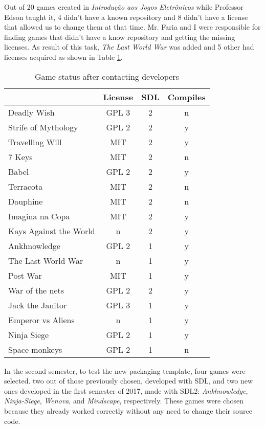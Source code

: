 Out of 20 games created in \textit{Introdu\c{c}\~ao aos Jogos Eletr\^onicos} while Professor Edson taught it, 4 didn't have a known repository and 8 didn't have a license that allowed us to change them at that time. Mr. Faria and I were responsible for finding games that didn't have a know repository and getting the missing licenses. As result of this task, \textit{The Last World War} was added and 5 other had licenses acquired as shown in Table \ref{tab:final_games}.

\begin{table}[h!]
\centering
\caption{Game status after contacting developers}
\label{tab:final_games}
\begin{tabular}{lccc}
\toprule
\textbf{} & \multicolumn{1}{l}{\textbf{License}} & \multicolumn{1}{l}{\textbf{SDL}} & \multicolumn{1}{l}{\textbf{Compiles}} \\
\midrule
Deadly Wish & GPL 3 & 2 & n \\
Strife of Mythology & GPL 2 & 2 & y \\
Travelling Will & MIT & 2 & y \\
7 Keys & MIT & 2 & n \\
Babel & GPL 2 & 2 & y \\
Terracota & MIT & 2 & n \\
Dauphine & MIT & 2 & n \\
Imagina na Copa & MIT & 2 & y \\
Kays Against the World & n & 2 & y \\
Ankhnowledge & GPL 2 & 1 & y \\
The Last World War & n & 1 & y \\
Post War & MIT & 1 & y \\
War of the nets & GPL 2 & 2 & y \\
Jack the Janitor & GPL 3 & 1 & y \\
Emperor vs Aliens & n & 1 & y \\
Ninja Siege & GPL 2 & 1 & y \\
Space monkeys & GPL 2 & 1 & n \\
\bottomrule
\end{tabular}
\end{table}

In the second semester, to test the new packaging template, four games were selected. two out of those previously chosen, developed with SDL, and two new ones developed in the first semester of 2017, made with SDL2: \textit{Ankhnowledge}, \textit{Ninja-Siege}, \textit{Wenova}, and \textit{Mindscape}, respectively. These games were chosen because they already worked correctly without any need to change their source code.


